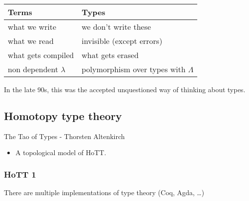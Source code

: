 \documentclass[11pt]{article}
\begin{document}
\begin{center}
\begin{tabular}{ll}
\hline
Terms & Types\\
\hline
what we write & we don't write these\\
what we read & invisible (except errors)\\
what gets compiled & what gets erased\\
non dependent $\lambda$ & polymorphism over types with $\Lambda$\\
\hline
\end{tabular}
\end{center}

In the late 90s, this was the accepted unquestioned way of thinking
about types.
\subsection*{Homotopy type theory}
\label{sec-9-3}
The Tao of Types - Thorsten Altenkirch

\begin{itemize}
\item A topological model of HoTT.
\end{itemize}

\subsubsection*{HoTT 1}
\label{sec-9-3-1}
There are multiple implementations of type theory (Coq, Agda, \ldots{})
\end{document}
